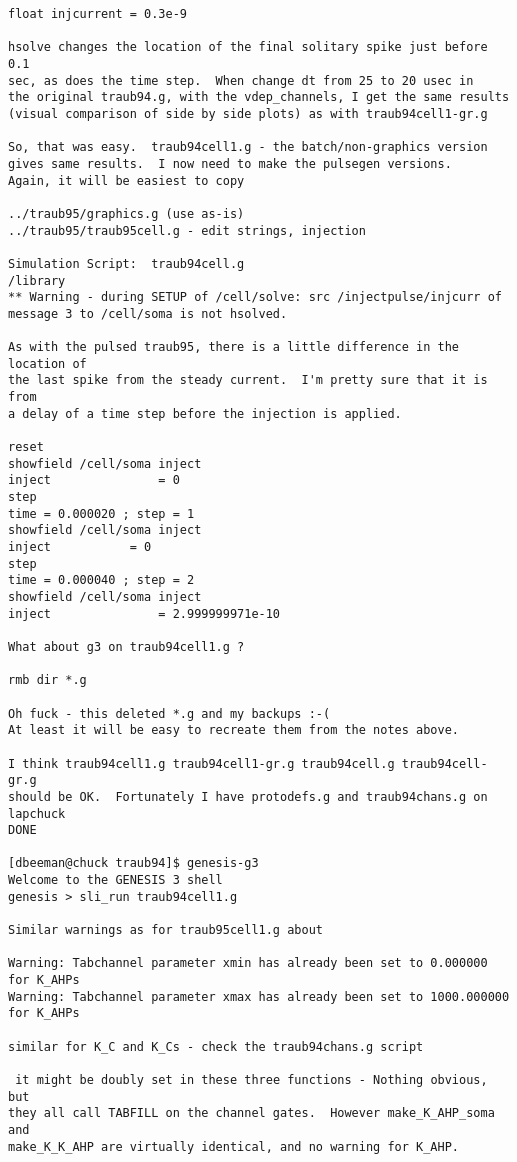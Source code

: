 \documentclass[12pt]{article}
\begin{document}
\begin{verbatim}
float injcurrent = 0.3e-9

hsolve changes the location of the final solitary spike just before 0.1
sec, as does the time step.  When change dt from 25 to 20 usec in
the original traub94.g, with the vdep_channels, I get the same results
(visual comparison of side by side plots) as with traub94cell1-gr.g

So, that was easy.  traub94cell1.g - the batch/non-graphics version
gives same results.  I now need to make the pulsegen versions.
Again, it will be easiest to copy

../traub95/graphics.g (use as-is)
../traub95/traub95cell.g - edit strings, injection

Simulation Script:  traub94cell.g
/library
** Warning - during SETUP of /cell/solve: src /injectpulse/injcurr of
message 3 to /cell/soma is not hsolved.

As with the pulsed traub95, there is a little difference in the location of
the last spike from the steady current.  I'm pretty sure that it is from
a delay of a time step before the injection is applied.

reset
showfield /cell/soma inject
inject               = 0
step
time = 0.000020 ; step = 1
showfield /cell/soma inject
inject		     = 0
step
time = 0.000040 ; step = 2          
showfield /cell/soma inject
inject               = 2.999999971e-10

What about g3 on traub94cell1.g ?

rmb dir *.g

Oh fuck - this deleted *.g and my backups :-(
At least it will be easy to recreate them from the notes above.

I think traub94cell1.g traub94cell1-gr.g traub94cell.g traub94cell-gr.g
should be OK.  Fortunately I have protodefs.g and traub94chans.g on lapchuck
DONE

[dbeeman@chuck traub94]$ genesis-g3
Welcome to the GENESIS 3 shell
genesis > sli_run traub94cell1.g

Similar warnings as for traub95cell1.g about

Warning: Tabchannel parameter xmin has already been set to 0.000000 for K_AHPs
Warning: Tabchannel parameter xmax has already been set to 1000.000000 for K_AHPs

similar for K_C and K_Cs - check the traub94chans.g script

 it might be doubly set in these three functions - Nothing obvious, but
they all call TABFILL on the channel gates.  However make_K_AHP_soma and
make_K_K_AHP are virtually identical, and no warning for K_AHP.


\end{verbatim}
\end{document}
